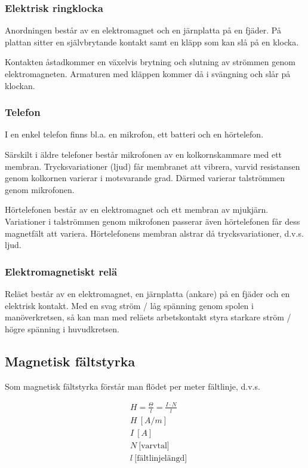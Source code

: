 \subsubsection{Elektrisk ringklocka}
Anordningen består av en elektromagnet och en järnplatta på en fjäder. På plattan
sitter en självbrytande kontakt samt en kläpp som kan slå på en klocka.

Kontakten åstadkommer en växelvis brytning och slutning av strömmen genom
elektromagneten. Armaturen med kläppen kommer då i svängning och slår på
klockan.

\subsubsection{Telefon}
I en enkel telefon finns bl.a. en mikrofon, ett batteri och en hörtelefon.

Särskilt i äldre telefoner består mikrofonen av en kolkornskammare med ett
membran. Trycksvariationer (ljud) får membranet att vibrera, varvid resistansen
genom kolkornen varierar i motsvarande grad. Därmed varierar talströmmen genom
mikrofonen.

Hörtelefonen består av en elektromagnet och ett membran av mjukjärn.
Variationer i talströmmen genom mikrofonen passerar även hörtelefonen får dess
magnetfält att variera. Hörtelefonens membran alstrar då trycksvariationer,
d.v.s. ljud.

\subsubsection{Elektromagnetiskt relä}
Reläet består av en elektromagnet, en järnplatta (ankare) på en fjäder och en
elektrisk kontakt. Med en svag ström / låg spänning genom spolen i
manöverkretsen, så kan man med reläets arbetskontakt styra starkare ström / högre
spänning i huvudkretsen.

\subsection{Magnetisk fältstyrka}

Som magnetisk fältstyrka förstår man flödet per meter fältlinje, d.v.s.

\begin{align*}
  &H = \frac{\Theta}{l} = \frac{I \cdot N}{l} \\
  &H\ [A/m] \\
  &I\ [A] \\
  &N\ \text{[varvtal]} \\
  &l\ \text{[fältlinjelängd]}
\end{align*}

